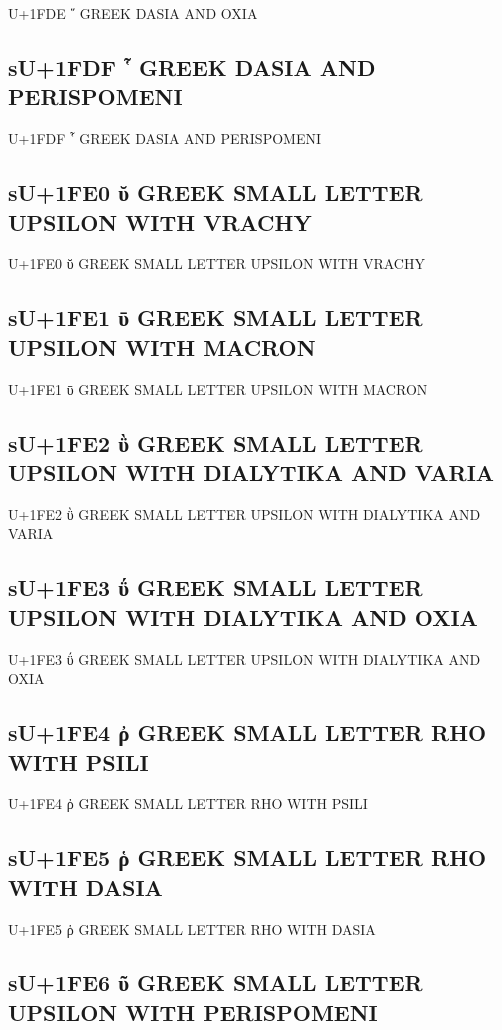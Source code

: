 U+1FDE ῞ GREEK DASIA AND OXIA

\subsection{sU+1FDF ῟ GREEK DASIA AND PERISPOMENI}

U+1FDF ῟ GREEK DASIA AND PERISPOMENI

\subsection{sU+1FE0 ῠ GREEK SMALL LETTER UPSILON WITH VRACHY}

U+1FE0 ῠ GREEK SMALL LETTER UPSILON WITH VRACHY

\subsection{sU+1FE1 ῡ GREEK SMALL LETTER UPSILON WITH MACRON}

U+1FE1 ῡ GREEK SMALL LETTER UPSILON WITH MACRON

\subsection{sU+1FE2 ῢ GREEK SMALL LETTER UPSILON WITH DIALYTIKA AND VARIA}

U+1FE2 ῢ GREEK SMALL LETTER UPSILON WITH DIALYTIKA AND VARIA

\subsection{sU+1FE3 ΰ GREEK SMALL LETTER UPSILON WITH DIALYTIKA AND OXIA}

U+1FE3 ΰ GREEK SMALL LETTER UPSILON WITH DIALYTIKA AND OXIA

\subsection{sU+1FE4 ῤ GREEK SMALL LETTER RHO WITH PSILI}

U+1FE4 ῤ GREEK SMALL LETTER RHO WITH PSILI

\subsection{sU+1FE5 ῥ GREEK SMALL LETTER RHO WITH DASIA}

U+1FE5 ῥ GREEK SMALL LETTER RHO WITH DASIA

\subsection{sU+1FE6 ῦ GREEK SMALL LETTER UPSILON WITH PERISPOMENI}

